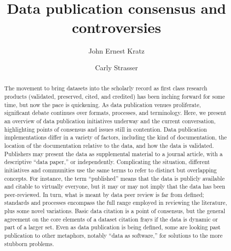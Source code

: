\documentclass[10pt,a4paper,twocolumn]{article}
\begin{document}
\title{Data publication consensus and controversies}
\author[1]{John Ernest Kratz}
\author[1]{Carly Strasser}

\maketitle
\thispagestyle{fancy}


\begin{abstract}


The movement to bring datasets into the scholarly record as first class research products (validated, preserved, cited, and credited) has been inching forward for some time, but now the pace is quickening.
As data publication venues proliferate, significant debate continues over formats, processes, and terminology.
Here, we present an overview of data publication initiatives underway and the current conversation, highlighting points of consensus and issues still in contention.
Data publication implementations differ in a variety of factors, including the kind of documentation, the location of the documentation relative to the data, and how the data is validated.
Publishers may present the data as supplemental material to a journal article, with a descriptive ``data paper,'' or independently.
Complicating the situation, different initiatives and communities use the same terms to refer to distinct but overlapping concepts.
For instance, the term ``published'' means that the data is publicly available and citable to virtually everyone, but it may or may not imply that the data has been peer-reviewed.
In turn, what is meant by data peer review is far from defined; standards and processes encompass the full range employed in reviewing the literature, plus some novel variations.
Basic data citation is a point of consensus, but the general agreement on the core elements of a dataset citation frays if the data is dynamic or part of a larger set.
Even as data publication is being defined, some are looking past publication to other metaphors, notably ``data as software,'' for solutions to the more stubborn problems.

\end{abstract}
\clearpage
\end{document}
